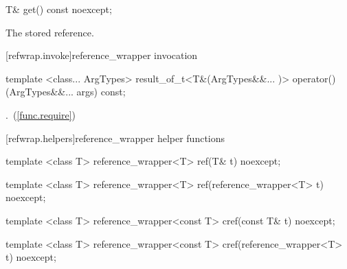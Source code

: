 %
\begin{itemdecl}
T& get() const noexcept;
\end{itemdecl}

\begin{itemdescr}
\pnum\returns The stored reference.
\end{itemdescr}


[refwrap.invoke]{reference_wrapper invocation}

%
\begin{itemdecl}
template <class... ArgTypes>
  result_of_t<T&(ArgTypes&&... )>
    operator()(ArgTypes&&... args) const;
\end{itemdecl}

\begin{itemdescr}
\pnum\returns {}.~(\ref{func.require})
\end{itemdescr}


[refwrap.helpers]{reference_wrapper helper functions}

%
\begin{itemdecl}
template <class T> reference_wrapper<T> ref(T& t) noexcept;
\end{itemdecl}

\begin{itemdescr}
\pnum\returns {}
\end{itemdescr}

%
\begin{itemdecl}
template <class T> reference_wrapper<T> ref(reference_wrapper<T> t) noexcept;
\end{itemdecl}

\begin{itemdescr}
\pnum\returns {}
\end{itemdescr}

%
\begin{itemdecl}
template <class T> reference_wrapper<const T> cref(const T& t) noexcept;
\end{itemdecl}

\begin{itemdescr}
\pnum\returns {}
\end{itemdescr}

%
\begin{itemdecl}
template <class T> reference_wrapper<const T> cref(reference_wrapper<T> t) noexcept;
\end{itemdecl}

